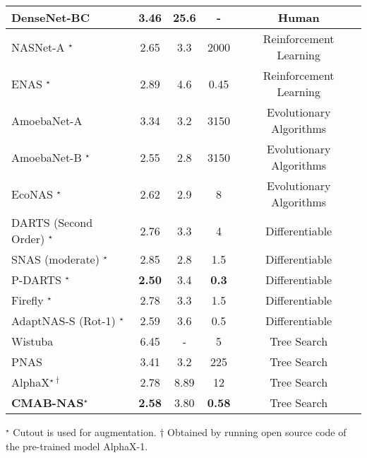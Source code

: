\documentclass[conference]{IEEEtran}
\begin{document}
\begin{table*}[!t]
\begin{adjustbox}{max width=\textwidth}
\begin{threeparttable}
\begin{tabular}{lcccc}
DenseNet-BC \cite{huang2017densely}                & 3.46  & 25.6  & -  & Human              \\ \hline
NASNet-A \cite{zoph2018learning} $^\star$          & 2.65  & 3.3   & 2000  & Reinforcement Learning \\
ENAS \cite{pham2018efficient} $^\star$             & 2.89  & 4.6   & 0.45  & Reinforcement Learning \\ 
AmoebaNet-A \cite{real2019regularized}             & 3.34  & 3.2   & 3150  & Evolutionary Algorithms \\
AmoebaNet-B \cite{real2019regularized}$^\star$     & 2.55  & 2.8   & 3150  & Evolutionary Algorithms \\ 
EcoNAS \cite{DBLP:journals/corr/abs-2001-01233}$^\star$ & 2.62 & 2.9 & 8   & Evolutionary Algorithms \\
DARTS (Second Order) \cite{liu2018darts}$^{\star}$ & 2.76 & 3.3 & 4 & Differentiable \\
SNAS (moderate) \cite{SNAS} $^\star$               & 2.85 & 2.8 & 1.5 & Differentiable \\
P-DARTS \cite{Chen2019pdarts} $^\star$             & \textbf{2.50} & 3.4 & \textbf{0.3} & Differentiable \\ 
Firefly \cite{wu2020firefly} $^\star$              & 2.78 & 3.3 & 1.5 & Differentiable \\ 
AdaptNAS-S (Rot-1) \cite{li2020adapting} $^\star$  & 2.59 & 3.6 & 0.5 & Differentiable \\ \hline
Wistuba\cite{wistuba2017finding} & 6.45 & - & 5 & Tree Search  \\
PNAS \cite{liu2018progressive}                      & 3.41 & 3.2 & 225 & Tree Search \\
AlphaX\cite{wang2019alphax}$^{\star \dagger}$     & 2.78 & 8.89 & 12 & Tree Search  \\
\textbf{CMAB-NAS$^\star$}                          & \textbf{2.58} & 3.80 & \textbf{0.58} & Tree Search  \\ \hline
\end{tabular}
\begin{tablenotes}
   \item[$^\star$ Cutout is used for augmentation. $\dagger$ Obtained by running open source code of the pre-trained model AlphaX-1.]
\end{tablenotes}
\end{threeparttable}
\end{adjustbox}
\end{table*}
\end{document}
